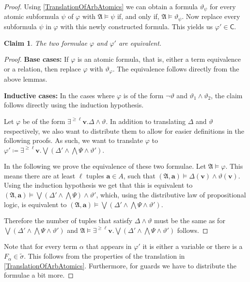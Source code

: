 \documentclass[a4paper,11pt,DIV=15]{scrartcl} %
\renewcommand{\phi}{\varphi}
\theoremstyle{plain}
\newtheorem{claim}[theorem]{Claim}
\theoremstyle{definition}
\renewcommand{\theta}{\vartheta}
\begin{document}
\begin{proof}
	Using \cref{TranslationOfArbAtomics} we can obtain a formula $\theta_\psi$ for every atomic subformula $\psi$ of $\phi$ with $\mathfrak A\models \psi$ if, and only if, $\mathfrak A\models \theta_\psi$.
	Now replace every subformula $\psi$ in $\phi$ with this newly constructed formula.
	This yields us $\phi'\in \mathsf{C}$.
	
	\begin{claim}
		The two formulae $\phi$ and $\phi'$ are equivalent.
	\end{claim}
	\begin{proof}
		\textbf{Base cases:}
		If $\phi$ is an atomic formula, that is, either a term equivalence or a relation, then replace $\phi$ with $\theta_\phi$.
		The equivalence follows directly from the above lemmas.
		
		\textbf{Inductive cases:}
		In the cases where $\phi$ is of the form $\neg\theta$ and $\theta_1\land\theta_2$, the claim follows directly using the induction hypothesis.
		
		Let $\phi$ be of the form $\exists^{\geq\ell}\mathbf v. \Delta\land \theta$.
		In addition to translating $\Delta$ and $\theta$ respectively, we also want to distribute them to allow for easier definitions in the following proofs.
		As such, we want to translate $\phi$ to $\phi'\coloneqq\exists^{\geq\ell}\mathbf v.\bigvee\left( \Delta'\land\bigwedge\Psi \land\theta'\right)$.
		
		In the following we prove the equivalence of these two formulae.
		Let $\mathfrak A\models \phi$.
		This means there are at least $\ell$ tuples $\mathbf a\in A$, such that $(\mathfrak A,\mathbf a)\models \Delta(\mathbf v) \land \theta(\mathbf v)$.
		Using the induction hypothesis we get that this is equivalent to $(\mathfrak A,\mathbf a)\models \bigvee(\Delta'\land\bigwedge\Psi)\land \theta'$, which, using the distributive law of propositional logic, is equivalent to $(\mathfrak A,\mathbf a)\models \bigvee(\Delta'\land\bigwedge\Psi\land\theta')$.
		
		Therefore the number of tuples that satisfy $\Delta\land\theta$ must be the same as for $\bigvee(\Delta'\land\bigwedge\Psi\land\theta')$ and $\mathfrak A\models \exists^{\geq\ell}\mathbf v. \bigvee (\Delta'\land\bigwedge\Psi\land\theta')$ follows.
	\end{proof}
	
	Note that for every term $\alpha$ that appears in $\phi'$ it is either a variable or there is a $F_\alpha \in \widetilde{\sigma}$.
	This follows from the properties of the translation in \cref{TranslationOfArbAtomics}.
	Furthermore, for guards we have to distribute the formulae a bit more.
	

\end{proof}
\end{document}
